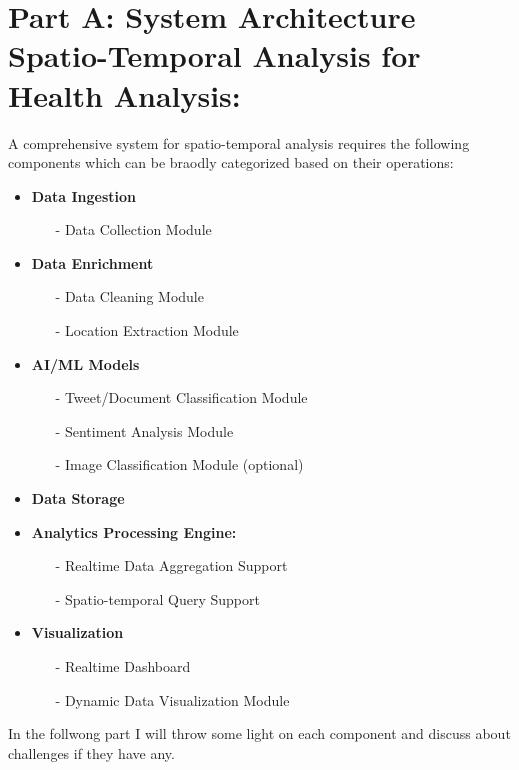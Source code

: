 \section{Part A: System Architecture  Spatio-Temporal Analysis for Health Analysis:}
\label{part_a}
A comprehensive system for spatio-temporal analysis requires the following components which can be braodly categorized based on their operations:

\begin{itemize}
  \item \textbf{Data Ingestion}
    {\em
    \begin{itemize}
      \item[-] Data Collection Module
    \end{itemize}
    }
  \item \textbf{Data Enrichment}
    {\em
    \begin{itemize}
    \item[-] Data Cleaning Module
    \item[-] Location Extraction Module
    \end{itemize}
    }
  \item \textbf{AI/ML Models}
    {\em
    \begin{itemize}
      \item[-] Tweet/Document Classification Module
      \item[-] Sentiment Analysis Module
      \item[-] Image Classification Module (optional)
    \end{itemize}
    }
  \item \textbf{Data Storage}
  \item \textbf{Analytics Processing Engine:}
    {\em
    \begin{itemize}
      \item[-] Realtime Data Aggregation Support
      \item[-] Spatio-temporal Query Support
    \end{itemize}
    }
  \item \textbf{Visualization}
    {\em
    \begin{itemize}
      \item[-] Realtime Dashboard
      \item[-] Dynamic Data Visualization Module
    \end{itemize}
    }
\end{itemize}

In the follwong part I will throw some light on each component and discuss about challenges if they have any.

